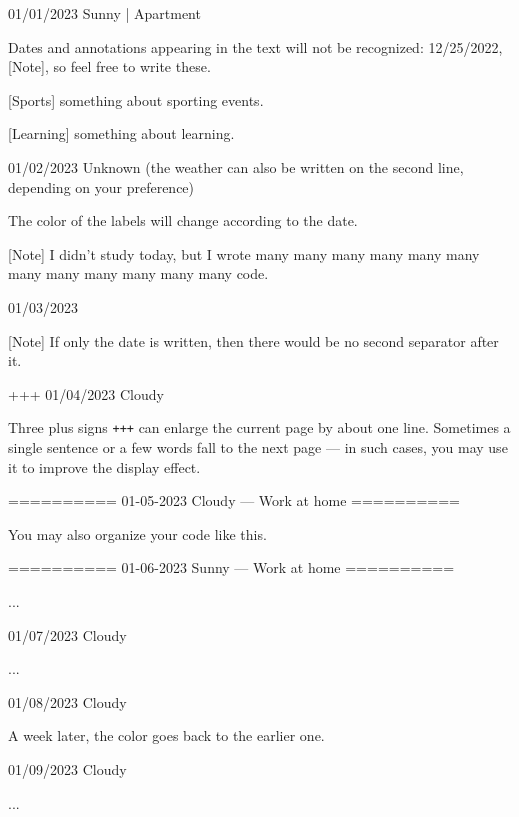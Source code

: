 \documentclass[11pt, paperstyle=light yellow, color entry, month-day-year]{jwjournal}
\begin{document}
01/01/2023 Sunny | Apartment

  Dates and annotations appearing in the text will not be recognized: 12/25/2022, [Note], so feel free to write these.

  [Sports] something about sporting events.

  [Learning] something about learning.



01/02/2023
Unknown (the weather can also be written on the second line, depending on your preference)

  The color of the labels will change according to the date.

  [Note] I didn't study today, but I wrote many many many many many many many many many many many many code.



01/03/2023

  [Note] If only the date is written, then there would be no second separator after it.


+++
01/04/2023  Cloudy

  Three plus signs \texttt{+++} can enlarge the current page by about one line. Sometimes a single sentence or a few words fall to the next page --- in such cases, you may use it to improve the display effect.



==========
01-05-2023    Cloudy        --- Work at home
==========

You may also organize your code like this.


==========
01-06-2023    Sunny         --- Work at home
==========

...



01/07/2023  Cloudy

  ...



01/08/2023  Cloudy

  A week later, the color goes back to the earlier one.



01/09/2023  Cloudy

  ...
\end{document}
